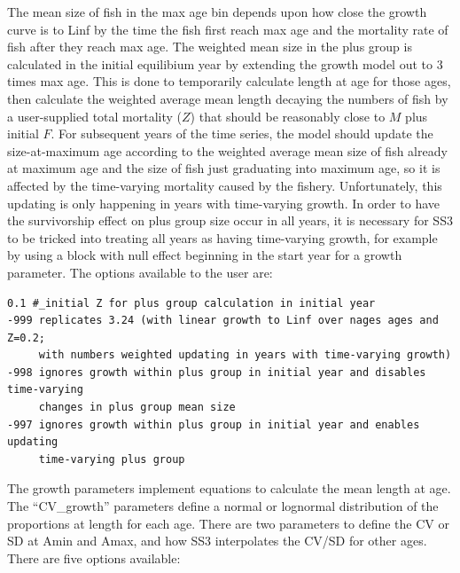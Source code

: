 The mean size of fish in the max age bin depends upon how close the growth curve is to Linf by the time the fish first reach max age and the mortality rate of fish after they reach max age. The weighted mean size in the plus group is calculated in the initial equilibium year by extending the growth model out to 3 times max age. This is done to temporarily calculate length at age for those ages, then calculate the weighted average mean length decaying the numbers of fish by a user-supplied total mortality ($Z$) that should be reasonably close to $M$ plus initial $F$. For subsequent years of the time series, the model should update the size-at-maximum age according to the weighted average mean size of fish already at maximum age and the size of fish just graduating into maximum age, so it is affected by the time-varying mortality caused by the fishery. Unfortunately, this updating is only happening in years with time-varying growth. In order to have the survivorship effect on plus group size occur in all years, it is necessary for SS3 to be tricked into treating all years as having time-varying growth, for example by using a block with null effect beginning in the start year for a growth parameter. The options available to the user are:

\begin{verbatim}
0.1 #_initial Z for plus group calculation in initial year
-999 replicates 3.24 (with linear growth to Linf over nages ages and Z=0.2; 
	 with numbers weighted updating in years with time-varying growth)
-998 ignores growth within plus group in initial year and disables time-varying 
     changes in plus group mean size
-997 ignores growth within plus group in initial year and enables updating 
     time-varying plus group
\end{verbatim}

\hypertarget{SDLAA}{}
The growth parameters implement equations to calculate the mean length at age.  The “CV\_growth” parameters define a normal or lognormal distribution of the proportions at length for each age.  There are two parameters to define the CV or SD at Amin and Amax, and how SS3 interpolates the CV/SD for other ages.  There are five options available:

